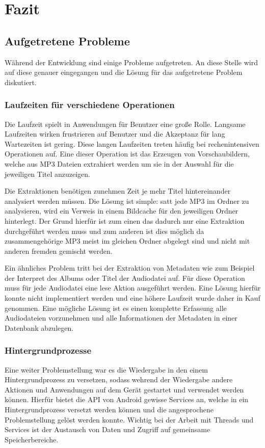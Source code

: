 \section{Fazit}
\subsection{Aufgetretene Probleme}
Während der Entwicklung sind einige Probleme aufgetreten. An diese Stelle wird auf diese genauer eingegangen und  die Lösung für das aufgetretene Problem diskutiert.
\subsubsection{Laufzeiten für verschiedene Operationen}
Die Laufzeit spielt in Anwendungen für Benutzer eine große Rolle. Langsame Laufzeiten wirken frustrieren auf Benutzer und die Akzeptanz für lang Wartezeiten ist gering. Diese langen Laufzeiten treten häufig bei rechenintensiven Operationen auf. Eine dieser Operation ist das Erzeugen von Vorschaubildern, welche aus MP3 Dateien extrahiert werden um sie in der Auswahl für die jeweiligen Titel anzuzeigen.

Die Extraktionen benötigen zunehmen Zeit je mehr Titel hintereinander analysiert werden müssen. Die Lösung ist simple: satt jede MP3 im Ordner zu analysieren, wird ein Verweis in einem Bildcache für den jeweiligen Ordner hinterlegt. Der Grund hierfür ist zum einen das dadurch nur eine Extraktion durchgeführt werden muss und zum anderen ist dies möglich da zusammengehörige MP3 meist im gleichen Ordner abgelegt sind und nicht mit anderen fremden gemischt werden.

Ein ähnliches Problem tritt bei der Extraktion von Metadaten wie zum Beispiel der Interpret des Albums oder Titel der Audiodatei auf. Für diese Operation muss für jede Audiodatei eine lese Aktion ausgeführt werden. Eine Lösung hierfür konnte nicht implementiert werden und eine höhere Laufzeit wurde daher in Kauf genommen. Eine mögliche Lösung ist es einen komplette Erfassung alle Audiodateien vorzunehmen und alle Informationen der Metadaten in einer Datenbank abzulegen.

\subsubsection{Hintergrundprozesse}
Eine weiter Problemstellung war es die Wiedergabe in den einem Hintergrundprozess zu versetzen, sodass wehrend der Wiedergabe andere Aktionen und Anwendungen auf dem Gerät gestartet und verwendet werden können. Hierfür bietet die API von Android gewisse Services an, welche in ein Hintergrundprozess versetzt werden können und die angesprochene Problemstellung gelöst werden konnte.
Wichtig bei der Arbeit mit Threads und Services ist der Austausch von Daten und Zugriff auf gemeinsame Speicherbereiche.

